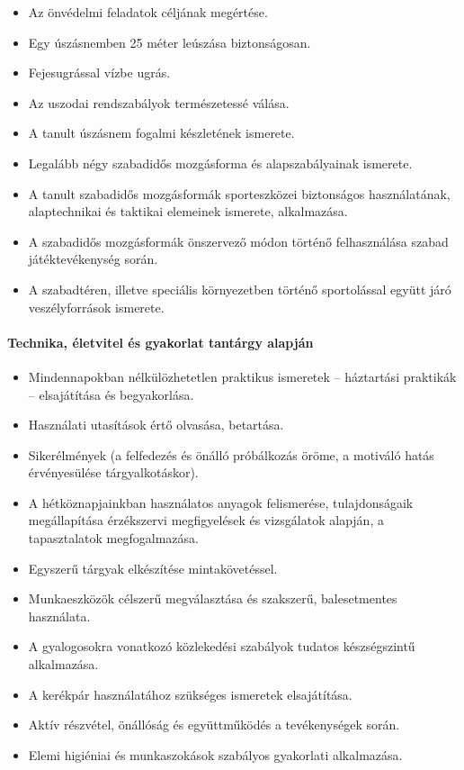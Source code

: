 \begin{itemize}
\item Az önvédelmi feladatok céljának megértése.
\item Egy úszásnemben 25 méter leúszása biztonságosan.
\item Fejesugrással vízbe ugrás.
\item Az uszodai rendszabályok természetessé válása.
\item A tanult úszásnem fogalmi készletének ismerete.
\item Legalább négy szabadidős mozgásforma és alapszabályainak ismerete.
\item A tanult szabadidős mozgásformák sporteszközei biztonságos használatának, alaptechnikai és taktikai elemeinek ismerete, alkalmazása.
\item A szabadidős mozgásformák önszervező módon történő felhasználása szabad játéktevékenység során.
\item A szabadtéren, illetve speciális környezetben történő sportolással együtt járó veszélyforrások ismerete.
\end{itemize}
\paragraph{Technika, életvitel és gyakorlat tantárgy alapján}
\begin{itemize}
\item Mindennapokban nélkülözhetetlen praktikus ismeretek – háztartási praktikák – elsajátítása és begyakorlása.
\item Használati utasítások értő olvasása, betartása.
\item Sikerélmények (a felfedezés és önálló próbálkozás öröme, a motiváló hatás érvényesülése tárgyalkotáskor).
\item A hétköznapjainkban használatos anyagok felismerése, tulajdonságaik megállapítása érzékszervi megfigyelések és vizsgálatok alapján, a tapasztalatok megfogalmazása.
\item Egyszerű tárgyak elkészítése mintakövetéssel.
\item Munkaeszközök célszerű megválasztása és szakszerű, balesetmentes használata.
\item A gyalogosokra vonatkozó közlekedési szabályok tudatos készségszintű alkalmazása.
\item A kerékpár használatához szükséges ismeretek elsajátítása.
\item Aktív részvétel, önállóság és együttműködés a tevékenységek során.
\item Elemi higiéniai és munkaszokások szabályos gyakorlati alkalmazása.
\end{itemize}
